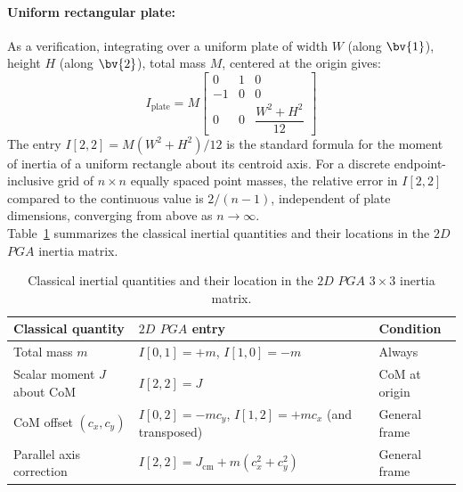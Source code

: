 \paragraph{Uniform rectangular plate:} As a verification, integrating over a uniform plate
of
width $W$ (along $\bv{1}$), height $H$ (along $\bv{2}$), total mass $M$, centered at the
origin gives:
\begin{equation}
    I_\mathrm{plate} = M
    \begin{bmatrix}
        0  &  1  &  0 \\
        -1 &  0  &  0 \\
        0  &  0  & \dfrac{W^2 + H^2}{12}
    \end{bmatrix}
    \label{eq:inertia_plate}
\end{equation}
The entry $I[2,2] = M(W^2+H^2)/12$ is the standard formula for the moment of inertia of a
uniform rectangle about its centroid axis. For a discrete endpoint-inclusive grid of $n
\times n$ equally spaced point masses, the relative error in $I[2,2]$ compared to the
continuous value is $2/(n-1)$, independent of plate dimensions, converging from above as
$n \to \infty$. \\

Table~\ref{tab:classical_pga2dp} summarizes the classical inertial quantities and their
locations in the $2D$ $PGA$ inertia matrix.

\begin{table}[h!]
\centering\small
\begin{tabular}{p{4cm}|p{5.5cm}|p{2.8cm}}
\hline
Classical quantity & $2D$ $PGA$ entry & Condition \\
\hline
Total mass $m$ & $I[0,1] = +m$,\; $I[1,0] = -m$ & Always \\
Scalar moment $J$ about CoM & $I[2,2] = J$ & CoM at origin \\
CoM offset $(c_x, c_y)$ & $I[0,2] = -mc_y$,\; $I[1,2] = +mc_x$ (and transposed) & General
frame \\
Parallel axis correction & $I[2,2] = J_\mathrm{cm} + m(c_x^2 + c_y^2)$ & General frame \\
\hline
\end{tabular}
\caption{Classical inertial quantities and their location in the $2D$ $PGA$ $3\times3$
inertia matrix.}
\label{tab:classical_pga2dp}
\end{table}

